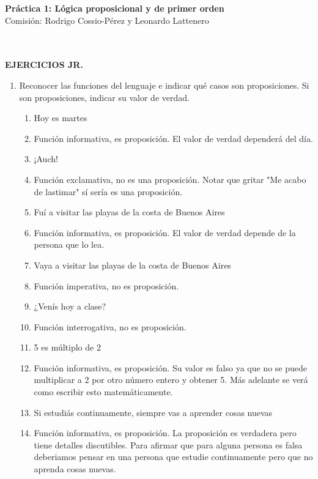 \documentclass[a4paper]{article}
\newcommand{\answer}{\item[**]}
\newcommand{\exercise}{\item}
\begin{document}
\noindent \hrulefill 
\vspace{-7pt}
\begin{center} 
	\textbf{ Práctica 1: Lógica proposicional y de primer orden } \\
	Comisión: Rodrigo Cossio-Pérez y Leonardo Lattenero
\end{center}
\vspace{-10pt}
\hrulefill \\
\phantom{~} \\
\textbf{EJERCICIOS JR.}

\begin{enumerate}

	\exercise Reconocer las funciones del lenguaje e indicar qué casos son proposiciones. Si son proposiciones, indicar su valor de verdad.
	\begin{multicols}{2}
	\begin{enumerate} [label=(\alph*)]
		\item Hoy es martes 
		\answer Función informativa, es proposición. El valor de verdad dependerá del día.

		\item ¡Auch!
		\answer Función exclamativa, no es una proposición. Notar que gritar "Me acabo de lastimar" sí sería es una proposición.

		\item Fuí a visitar las playas de la costa de Buenos Aires 
		\answer Función informativa, es proposición. El valor de verdad depende de la persona que lo lea.

		\item Vaya a visitar las playas de la costa de Buenos Aires
		\answer Función imperativa, no es proposición.

		\item ¿Venís hoy a clase?
		\answer Función interrogativa, no es proposición.

		\item 5 es múltiplo de 2 
		\answer Función informativa, es proposición. Su valor es falso ya que no se puede multiplicar a 2 por otro número entero y obtener 5. Más adelante se verá como escribir esto matemáticamente.

		\item Si estudiás continuamente, siempre vas a aprender cosas nuevas 
		\answer Función informativa, es proposición. La proposición es verdadera pero tiene detalles discutibles. Para afirmar que para alguna persona es falsa deberiamos pensar en una persona que estudie continuamente pero que no aprenda cosas nuevas.


\end{enumerate}
\end{multicols}
\end{enumerate}
\end{document}
